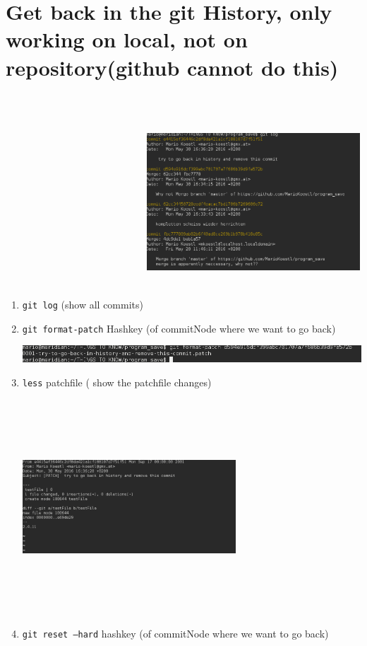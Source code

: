 \documentclass[ twoside,openright,titlepage,numbers=noenddot,headinclude,%
                footinclude=true, cleardoublepage=empty,abstractoff, %
                BCOR=5mm,paper=a4,fontsize=11pt,%
                ]{scrreprt}
\begin{document}
\section{Get back in the git History, only working on local, not on repository(github cannot do this)}
	\begin{enumerate}
		\item \texttt{git log} (show all commits)
			\includegraphics[width=8cm,height=8cm]{pictures/gitLog.png}
		\item \texttt{git format-patch} Hashkey  (of commitNode where we want to go back)
		
			\includegraphics[scale=0.5]{pictures/patchFileCreated.png}
		\item \texttt{less} patchfile ( show the patchfile changes)
		
			\includegraphics[width=8cm,height=8cm]{pictures/patchFile.png}
		\item \texttt{git reset --hard} hashkey (of commitNode where we want to go back)
		

\end{enumerate}
\end{document}
